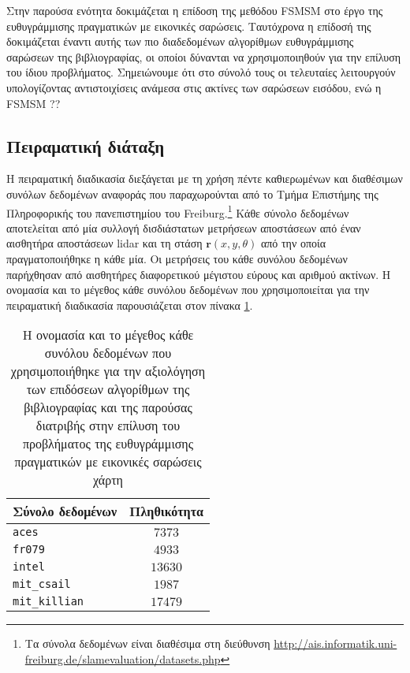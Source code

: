 Στην παρούσα ενότητα δοκιμάζεται η επίδοση της μεθόδου FSMSM στο έργο της
ευθυγράμμισης πραγματικών με εικονικές σαρώσεις. Ταυτόχρονα η επίδοσή της
δοκιμάζεται έναντι αυτής των πιο διαδεδομένων αλγορίθμων ευθυγράμμισης σαρώσεων
της βιβλιογραφίας, οι οποίοι δύνανται να χρησιμοποιηθούν για την επίλυση του
ίδιου προβλήματος. Σημειώνουμε ότι στο σύνολό τους οι τελευταίες λειτουργούν
υπολογίζοντας αντιστοιχίσεις ανάμεσα στις ακτίνες των σαρώσεων εισόδου, ενώ η
FSMSM ??

\subsection{Πειραματική διάταξη}
\label{subsection:02_04_05:01}

Η πειραματική διαδικασία διεξάγεται με τη χρήση πέντε καθιερωμένων και
διαθέσιμων συνόλων δεδομένων αναφοράς που παραχωρούνται από το Τμήμα Επιστήμης
της Πληροφορικής του πανεπιστημίου του Freiburg.\footnote{Τα σύνολα δεδομένων
είναι διαθέσιμα στη διεύθυνση
\url{http://ais.informatik.uni-freiburg.de/slamevaluation/datasets.php}} Κάθε
σύνολο δεδομένων αποτελείται από μία συλλογή δισδιάστατων μετρήσεων
αποστάσεων από έναν αισθητήρα αποστάσεων lidar και τη στάση
$\bm{r}(x,y,\theta)$ από την οποία πραγματοποιήθηκε η κάθε μία. Οι μετρήσεις
του κάθε συνόλου δεδομένων παρήχθησαν από αισθητήρες διαφορετικού μέγιστου
εύρους και αριθμού ακτίνων. Η ονομασία και το μέγεθος κάθε συνόλου δεδομένων
που χρησιμοποιείται για την πειραματική διαδικασία παρουσιάζεται στον πίνακα
\ref{tbl:02:04_05:dataset_sizes}.

\begin{table}\centering
  \begin{tabular}{lc}
  Σύνολο δεδομένων      & Πληθικότητα  \\  \toprule
  \texttt{aces}         & $7373$       \\
  \texttt{fr079}        & $4933$       \\
  \texttt{intel}        & $13630$      \\
  \texttt{mit\_csail}   & $1987$       \\
  \texttt{mit\_killian} & $17479$      \\  \bottomrule
  \end{tabular}
\caption{\small Η ονομασία και το μέγεθος κάθε συνόλου δεδομένων που
         χρησιμοποιήθηκε για την αξιολόγηση των επιδόσεων αλγορίθμων της
         βιβλιογραφίας και της παρούσας διατριβής στην επίλυση του προβλήματος
         της ευθυγράμμισης πραγματικών με εικονικές σαρώσεις χάρτη}
  \label{tbl:02:04_05:dataset_sizes}
\end{table}

